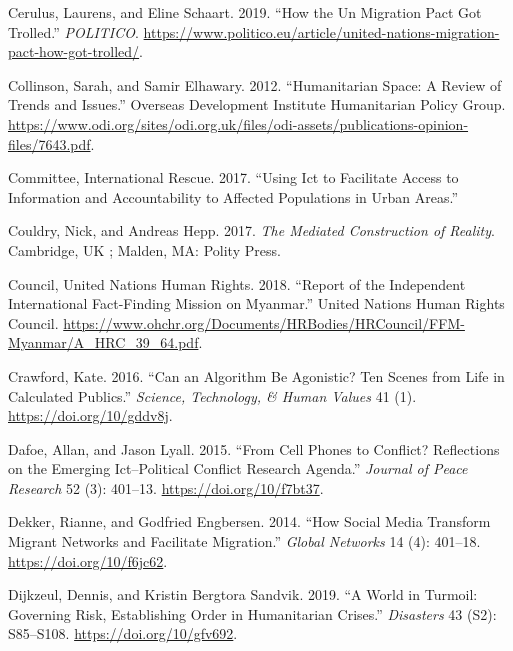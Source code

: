 \documentclass[
]{article}
\newlength{\cslhangindent}
\newenvironment{cslreferences}%
  {\setlength{\parindent}{0pt}%
  \everypar{\setlength{\hangindent}{\cslhangindent}}\ignorespaces}%
  {\par}
\begin{document}
\begin{cslreferences}
\leavevmode\hypertarget{ref-Cerulus2019How}{}%
Cerulus, Laurens, and Eline Schaart. 2019. ``How the Un Migration Pact
Got Trolled.'' \emph{POLITICO}.
\url{https://www.politico.eu/article/united-nations-migration-pact-how-got-trolled/}.

\leavevmode\hypertarget{ref-Collinson2012Humanitarian}{}%
Collinson, Sarah, and Samir Elhawary. 2012. ``Humanitarian Space: A
Review of Trends and Issues.'' Overseas Development Institute
Humanitarian Policy Group.
\url{https://www.odi.org/sites/odi.org.uk/files/odi-assets/publications-opinion-files/7643.pdf}.

\leavevmode\hypertarget{ref-InternationalRescueCommittee2017Using}{}%
Committee, International Rescue. 2017. ``Using Ict to Facilitate Access
to Information and Accountability to Affected Populations in Urban
Areas.''

\leavevmode\hypertarget{ref-Couldry2017mediated}{}%
Couldry, Nick, and Andreas Hepp. 2017. \emph{The Mediated Construction
of Reality}. Cambridge, UK ; Malden, MA: Polity Press.

\leavevmode\hypertarget{ref-UnitedNationsHumanRightsCouncil2018Report}{}%
Council, United Nations Human Rights. 2018. ``Report of the Independent
International Fact-Finding Mission on Myanmar.'' United Nations Human
Rights Council.
\url{https://www.ohchr.org/Documents/HRBodies/HRCouncil/FFM-Myanmar/A_HRC_39_64.pdf}.

\leavevmode\hypertarget{ref-Crawford2016Can}{}%
Crawford, Kate. 2016. ``Can an Algorithm Be Agonistic? Ten Scenes from
Life in Calculated Publics.'' \emph{Science, Technology, \& Human
Values} 41 (1). \url{https://doi.org/10/gddv8j}.

\leavevmode\hypertarget{ref-Dafoe2015From}{}%
Dafoe, Allan, and Jason Lyall. 2015. ``From Cell Phones to Conflict?
Reflections on the Emerging Ict--Political Conflict Research Agenda.''
\emph{Journal of Peace Research} 52 (3): 401--13.
\url{https://doi.org/10/f7bt37}.

\leavevmode\hypertarget{ref-Dekker2014How}{}%
Dekker, Rianne, and Godfried Engbersen. 2014. ``How Social Media
Transform Migrant Networks and Facilitate Migration.'' \emph{Global
Networks} 14 (4): 401--18. \url{https://doi.org/10/f6jc62}.

\leavevmode\hypertarget{ref-Dijkzeul2019world}{}%
Dijkzeul, Dennis, and Kristin Bergtora Sandvik. 2019. ``A World in
Turmoil: Governing Risk, Establishing Order in Humanitarian Crises.''
\emph{Disasters} 43 (S2): S85--S108. \url{https://doi.org/10/gfv692}.


\end{cslreferences}
\end{document}
